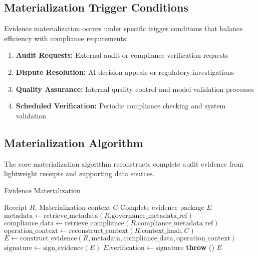 \documentclass[12pt,a4paper]{article}
\begin{document}
\subsection{Materialization Trigger Conditions}

Evidence materialization occurs under specific trigger conditions that balance efficiency with compliance requirements:

\begin{enumerate}
\item \textbf{Audit Requests:} External audit or compliance verification requests
\item \textbf{Dispute Resolution:} AI decision appeals or regulatory investigations  
\item \textbf{Quality Assurance:} Internal quality control and model validation processes
\item \textbf{Scheduled Verification:} Periodic compliance checking and system validation
\end{enumerate}

\subsection{Materialization Algorithm}

The core materialization algorithm reconstructs complete audit evidence from lightweight receipts and supporting data sources.

\begin{algorithm}[H]
\caption{Evidence Materialization}
\begin{algorithmic}[1]
\REQUIRE Receipt $R$, Materialization context $C$
\ENSURE Complete evidence package $E$
\STATE $\text{metadata} \leftarrow \text{retrieve\_metadata}(R.\text{governance\_metadata\_ref})$
\STATE $\text{compliance\_data} \leftarrow \text{retrieve\_compliance}(R.\text{compliance\_metadata\_ref})$
\STATE $\text{operation\_context} \leftarrow \text{reconstruct\_context}(R.\text{context\_hash}, C)$
    \STATE $E \leftarrow \text{construct\_evidence}(R, \text{metadata}, \text{compliance\_data}, \text{operation\_context})$
    \STATE $\text{signature} \leftarrow \text{sign\_evidence}(E)$
    \STATE $E.\text{verification} \leftarrow \text{signature}$
\ELSE
    \STATE \textbf{throw} ()
\ENDIF
\RETURN $E$
\end{algorithmic}
\end{algorithm}
\end{document}
